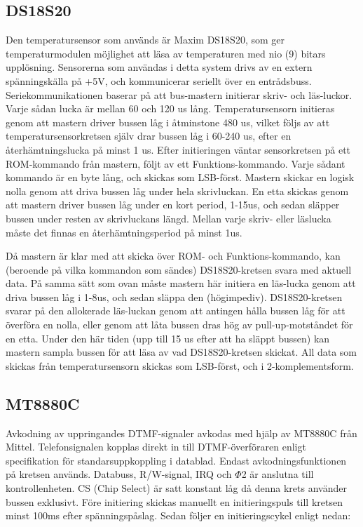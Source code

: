 \documentclass[a4paper,11pt]{article}
\begin{document}
	\subsection{DS18S20}
	
		Den temperatursensor som används är Maxim DS18S20, som ger temperaturmodulen möjlighet att läsa av temperaturen
		med nio (9) bitars upplösning. Sensorerna som användas i detta system drivs av en extern spänningskälla på +5V,
		och kommunicerar seriellt över en entrådsbuss. Seriekommunikationen baserar på att bus-mastern initierar skriv-
		och läs-luckor. Varje sådan lucka är mellan 60 och 120 us lång. Temperatursensorn initieras genom att mastern
		driver bussen låg i åtminstone 480 us, vilket följs av att temperatursensorkretsen själv drar bussen låg i 60-240 us,
		efter en återhämtningslucka på minst 1 us. Efter initieringen väntar sensorkretsen på ett ROM-kommando från mastern,
		följt av ett Funktions-kommando. Varje sådant kommando är en byte lång, och skickas som LSB-först. Mastern skickar
		en logisk nolla genom att driva bussen låg under hela skrivluckan. En etta skickas genom att mastern driver bussen låg
		under en kort period, 1-15us, och sedan släpper bussen under resten av skrivluckans längd. Mellan varje skriv- eller läslucka
		måste det finnas en återhämtningsperiod på minst 1us.

		Då mastern är klar med att skicka över ROM- och Funktions-kommando, kan (beroende på vilka kommandon som sändes) DS18S20-kretsen
		svara med aktuell data. På samma sätt som ovan måste mastern här initiera en läs-lucka genom att driva bussen låg i 1-8us, och
		sedan släppa den (högimpediv). DS18S20-kretsen svarar på den allokerade läs-luckan genom att antingen hålla bussen låg för att
		överföra en nolla, eller genom att låta bussen dras hög av pull-up-motståndet för en etta. Under den här tiden (upp till 15 us
		efter att ha släppt bussen) kan mastern sampla bussen för att läsa av vad DS18S20-kretsen skickat. All data som skickas från
		temperatursensorn skickas som LSB-först, och i 2-komplementsform.\\

	\subsection{MT8880C}
	
		Avkodning av uppringandes DTMF-signaler avkodas med hjälp av MT8880C från Mittel. 
		Telefonsignalen kopplas direkt in till DTMF-överföraren enligt specifikation för standarsuppkoppling i datablad. Endast avkodningsfunktionen på 		kretsen används. Databuss, R/W-signal, IRQ och $\Phi$2 är anslutna till kontrollenheten. 
		CS (Chip Select) är satt konstant låg då denna krets använder bussen exklusivt. 
Före initiering skickas manuellt en initieringspuls till kretsen minst 100ms efter spänningspåslag. Sedan följer
en initieringscykel enligt nedan:\\
\end{document}
